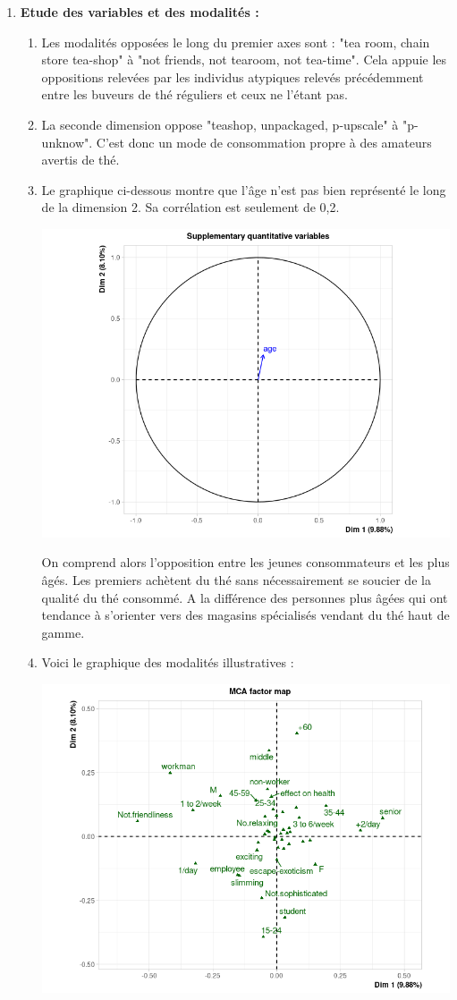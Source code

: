 \documentclass{article}
\begin{document}
\begin{enumerate}
\begin{enumerate}
\begin{center}
\end{center}

	\end{enumerate}

\item \textbf{Etude des variables et des modalités :}

	\begin{enumerate}
	\item Les modalités opposées le long du premier axes sont : "tea room, chain store tea-shop" à "not friends, not tearoom, not tea-time". Cela appuie les oppositions relevées par les individus atypiques relevés précédemment entre les buveurs de thé réguliers et ceux ne l'étant pas.
	\item La seconde dimension oppose "teashop, unpackaged, p-upscale" à "p-unknow". C'est donc un mode de consommation propre à des amateurs avertis de thé.  
	\item Le graphique ci-dessous montre que l'âge n'est pas bien représenté le long de la dimension 2. Sa corrélation est seulement de 0,2.

\begin{center}
\includegraphics[width=0.7\linewidth]{image/age.png}
\end{center}
	
	 On comprend alors l'opposition entre les jeunes consommateurs et les plus âgés. Les premiers achètent du thé sans nécessairement se soucier de la qualité du thé consommé. A la différence des personnes plus âgées qui ont tendance à s'orienter vers des magasins spécialisés vendant du thé haut de gamme.
	\item Voici le graphique des modalités illustratives :
	
	\begin{center}
	 \includegraphics[width=0.6\linewidth]{image/modalite.png}
	 \end{center} 
	

\end{enumerate}
\end{enumerate}
\end{document}
